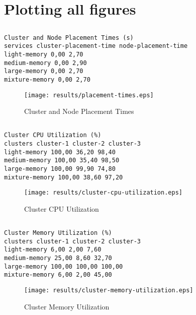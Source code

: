 \documentclass{elsart}
\begin{document}
\section{Plotting all figures}
\subsection{}

\begin{lstlisting}[caption={Cluster and Node Placement Times}]
Cluster and Node Placement Times (s)
services cluster-placement-time node-placement-time
light-memory 0,00 2,70
medium-memory 0,00 2,90
large-memory 0,00 2,70
mixture-memory 0,00 2,70
\end{lstlisting}

\begin{figure}[ht]
\centering
\texttt{[image: results/placement-times.eps]}
\caption{Cluster and Node Placement Times}\label{fig:placement-times.eps}
\end{figure}

\subsection{}

\begin{lstlisting}[caption={Cluster CPU Utilization}]
Cluster CPU Utilization (%)
clusters cluster-1 cluster-2 cluster-3
light-memory 100,00 36,20 98,40
medium-memory 100,00 35,40 98,50
large-memory 100,00 99,90 74,80
mixture-memory 100,00 38,60 97,20
\end{lstlisting}

\begin{figure}[ht]
\centering
\texttt{[image: results/cluster-cpu-utilization.eps]}
\caption{Cluster CPU Utilization}\label{fig:cluster-cpu-utilization.eps}
\end{figure}

\subsection{}

\begin{lstlisting}[caption={Cluster Memory Utilization}]
Cluster Memory Utilization (%)
clusters cluster-1 cluster-2 cluster-3
light-memory 6,00 2,00 7,60
medium-memory 25,00 8,60 32,70
large-memory 100,00 100,00 100,00
mixture-memory 6,00 2,00 45,00
\end{lstlisting}

\begin{figure}[ht]
\centering
\texttt{[image: results/cluster-memory-utilization.eps]}
\caption{Cluster Memory Utilization}\label{fig:cluster-memory-utilization.eps}
\end{figure}
\end{document}
